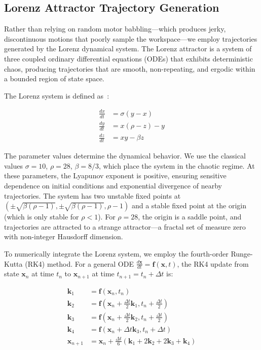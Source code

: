 \documentclass[12pt,a4paper,oneside]{report}
\begin{document}
\subsection{Lorenz Attractor Trajectory Generation}

Rather than relying on random motor babbling—which produces jerky, discontinuous motions that poorly sample the workspace—we employ trajectories generated by the Lorenz dynamical system. The Lorenz attractor is a system of three coupled ordinary differential equations (ODEs) that exhibits deterministic chaos, producing trajectories that are smooth, non-repeating, and ergodic within a bounded region of state space.

The Lorenz system is defined as~\cite{lorenz1963}:

\begin{align}
\frac{dx}{dt} &= \sigma(y - x) \\
\frac{dy}{dt} &= x(\rho - z) - y \\
\frac{dz}{dt} &= xy - \beta z
\end{align}

The parameter values determine the dynamical behavior. We use the classical values $\sigma = 10$, $\rho = 28$, $\beta = 8/3$, which place the system in the chaotic regime. At these parameters, the Lyapunov exponent is positive, ensuring sensitive dependence on initial conditions and exponential divergence of nearby trajectories. The system has two unstable fixed points at $(\pm\sqrt{\beta(\rho-1)}, \pm\sqrt{\beta(\rho-1)}, \rho-1)$ and a stable fixed point at the origin (which is only stable for $\rho < 1$). For $\rho = 28$, the origin is a saddle point, and trajectories are attracted to a strange attractor—a fractal set of measure zero with non-integer Hausdorff dimension.

To numerically integrate the Lorenz system, we employ the fourth-order Runge-Kutta (RK4) method. For a general ODE $\frac{d\mathbf{x}}{dt} = \mathbf{f}(\mathbf{x}, t)$, the RK4 update from state $\mathbf{x}_n$ at time $t_n$ to $\mathbf{x}_{n+1}$ at time $t_{n+1} = t_n + \Delta t$ is:

\begin{align}
\mathbf{k}_1 &= \mathbf{f}(\mathbf{x}_n, t_n) \\
\mathbf{k}_2 &= \mathbf{f}(\mathbf{x}_n + \frac{\Delta t}{2}\mathbf{k}_1, t_n + \frac{\Delta t}{2}) \\
\mathbf{k}_3 &= \mathbf{f}(\mathbf{x}_n + \frac{\Delta t}{2}\mathbf{k}_2, t_n + \frac{\Delta t}{2}) \\
\mathbf{k}_4 &= \mathbf{f}(\mathbf{x}_n + \Delta t \mathbf{k}_3, t_n + \Delta t) \\
\mathbf{x}_{n+1} &= \mathbf{x}_n + \frac{\Delta t}{6}(\mathbf{k}_1 + 2\mathbf{k}_2 + 2\mathbf{k}_3 + \mathbf{k}_4)
\end{align}
\end{document}
